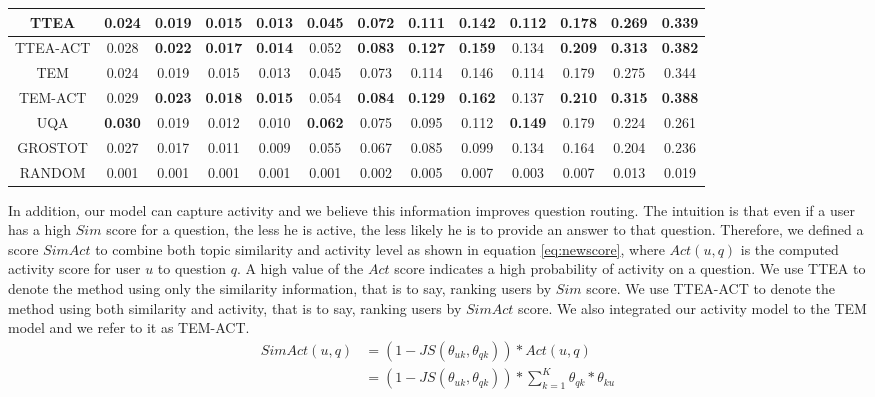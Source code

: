 {{{{{{{\begin{sidewaystable}
\begin{tabular}{|c|c|c|c|c|c|c|c|c|c|c|c|c|}
TTEA&0.024&0.019&0.015&0.013&0.045&0.072&0.111&0.142&0.112&0.178&0.269&0.339 \\ \hline
TTEA-ACT&0.028&\textbf{0.022}&\textbf{0.017}&\textbf{0.014}&0.052&\textbf{0.083}&\textbf{0.127}&\textbf{0.159}&0.134&\textbf{0.209}&\textbf{0.313}&\textbf{0.382} \\ \hline
TEM&0.024&0.019&0.015&0.013&0.045&0.073&0.114&0.146&0.114&0.179&0.275&0.344 \\ \hline
TEM-ACT&0.029&\textbf{0.023}&\textbf{0.018}&\textbf{0.015}&0.054&\textbf{0.084}&\textbf{0.129}&\textbf{0.162}&0.137&\textbf{0.210}&\textbf{0.315}&\textbf{0.388} \\ \hline
UQA&\textbf{0.030}&0.019&0.012&0.010&\textbf{0.062}&0.075&0.095&0.112&\textbf{0.149}&0.179&0.224&0.261 \\ \hline
GROSTOT&0.027&0.017&0.011&0.009&0.055&0.067&0.085&0.099&0.134&0.164&0.204&0.236 \\ \hline
RANDOM&0.001&0.001&0.001&0.001&0.001&0.002&0.005&0.007&0.003&0.007&0.013&0.019 \\ \hline
\end{tabular}
\end{sidewaystable}

In addition, our model can capture activity and we believe this information improves question routing. The intuition is that even if a user has a high $Sim$ score for a question, the less he is active, the less likely he is to provide an answer to that question. Therefore, we defined a score $SimAct$ to combine both topic similarity and activity level as shown in equation \ref{eq:newscore}, where $Act(u,q)$ is the computed activity score for user $u$ to question $q$. A high value of the $Act$ score indicates a high probability of activity on a question. We use TTEA to denote the method using only the similarity information, that is to say, ranking users by $Sim$ score. We use TTEA-ACT to denote the method using both similarity and activity, that is to say, ranking users by $SimAct$ score. We also integrated our activity model to the TEM model  and we refer to it as TEM-ACT. 
\begin{equation}
\begin{split}
SimAct(u,q) &= (1 -JS(\theta_{uk},\theta_{qk}))* Act(u,q) \\
         &= (1 -JS(\theta_{uk},\theta_{qk}))* \sum_{k=1}^{K} \theta_{qk} * \theta_{ku}
\end{split}
\label{eq:newscore}
\end{equation} 


}}}}}}}
